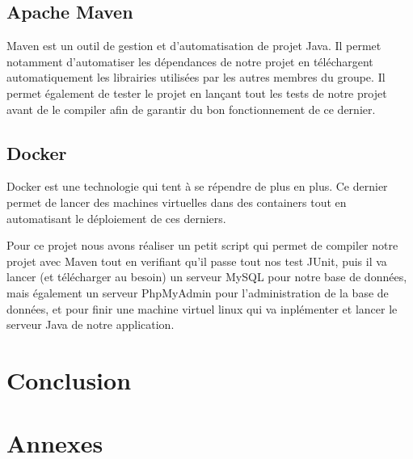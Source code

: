 \documentclass[a4paper,12pt]{article}
\begin{document}
		\subsection{Apache Maven} \label{maven}
		Maven est un outil de gestion et d'automatisation de projet Java. Il permet notamment d'automatiser les dépendances de notre projet en téléchargent automatiquement les librairies utilisées par les autres membres du groupe. Il permet également de tester le projet en lançant tout les tests de notre projet avant de le compiler afin de garantir du bon fonctionnement de ce dernier. 
		
		\subsection{Docker}
		Docker est une technologie qui tent à se répendre de plus en plus. Ce dernier permet de lancer des machines virtuelles dans des containers tout en automatisant le déploiement de ces derniers. 
		
		Pour ce projet nous avons réaliser un petit script qui permet de compiler notre projet avec Maven tout en verifiant qu'il passe tout nos test JUnit, puis il va lancer (et télécharger au besoin) un serveur MySQL pour notre base de données, mais également un serveur PhpMyAdmin pour l'administration de la base de données, et pour finir une machine virtuel linux qui va inplémenter et lancer le serveur Java de notre application. 
	
	\section{Conclusion}
	
	\newpage
	\section{Annexes}

	
	
	
	
\end{document}
